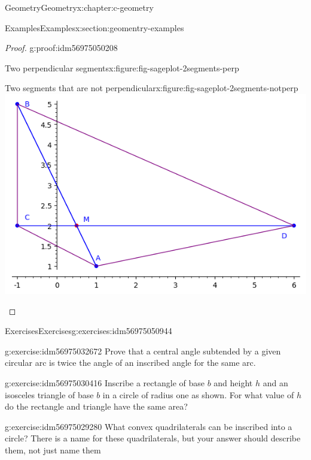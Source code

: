 \documentclass[twoside,10pt,]{book}
\numberwithin{equation}{section}
\begin{document}
\begin{chapterptx}{Geometry}{}{Geometry}{}{}{x:chapter:c-geometry}
\begin{sectionptx}{Examples}{}{Examples}{}{}{x:section:geomentry-examples}
\begin{proof}{}{g:proof:idm56975050208}
\begin{sidebyside}{2}{0}{0}{0}
\begin{sbspanel}{0.5}
\begin{figureptx}{Two perpendicular segments}{x:figure:fig-sageplot-2segments-perp}{}
\tcblower
\end{figureptx}%
\end{sbspanel}%
\begin{sbspanel}{0.5}%
\begin{figureptx}{Two segments that are not perpendicular}{x:figure:fig-sageplot-2segments-notperp}{}%
\includegraphics[width=\linewidth]{images/sageplot-2segments-notperp.png}
\tcblower
\end{figureptx}%
\end{sbspanel}%
\end{sidebyside}%
\end{proof}
\end{sectionptx}
%
%
\typeout{************************************************}
\typeout{************************************************}
%
\begin{exercises-section}{Exercises}{}{Exercises}{}{}{g:exercises:idm56975050944}
\begin{divisionexercise}{1}{}{}{g:exercise:idm56975032672}%
Prove that a central angle subtended by a given circular arc is twice the angle of an inscribed angle for the same arc.%
\end{divisionexercise}%
\begin{divisionexercise}{2}{}{}{g:exercise:idm56975030416}%
Inscribe a rectangle of base \(b\) and height \(h\) and an isosceles triangle of base \(b\) in a circle of radius one as shown. For what value of \(h\) do the rectangle and triangle have the same area?%
\end{divisionexercise}%
\begin{divisionexercise}{3}{}{}{g:exercise:idm56975029280}%
What convex quadrilaterals can be inscribed into a circle? There is a name for these quadrilaterals, but your answer should describe them, not just name them%

\end{divisionexercise}
\end{exercises-section}
\end{chapterptx}
\end{document}
